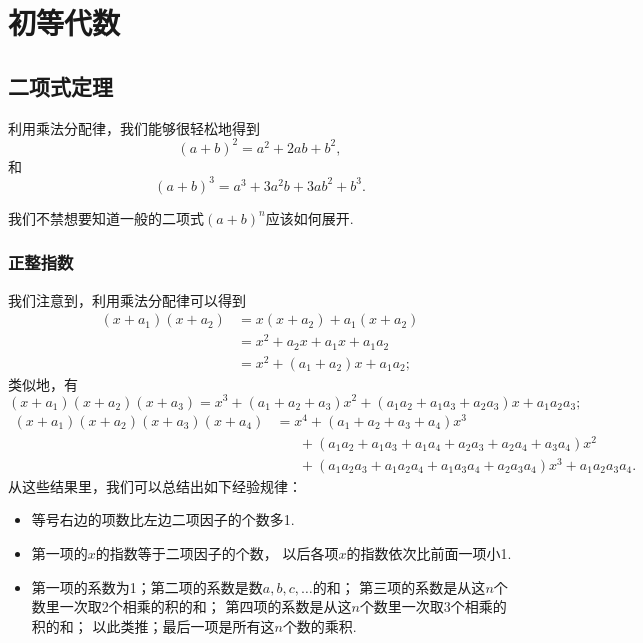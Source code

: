 \chapter{初等代数}
\section{二项式定理}
利用乘法分配律，我们能够很轻松地得到%
\begin{equation}
	(a + b)^2 = a^2 + 2ab + b^2,
\end{equation}
和%
\begin{equation}
	(a + b)^3 = a^3 + 3 a^2 b + 3 a b^2 + b^3.
\end{equation}

我们不禁想要知道一般的二项式\((a+b)^n\)应该如何展开.

\subsection{正整指数}
我们注意到，利用乘法分配律可以得到\begin{align*}
	(x+a_1)(x+a_2)
	&= x(x+a_2) + a_1(x+a_2) \\
	&= x^2 + a_2x + a_1x + a_1a_2 \\
	&= x^2 + (a_1+a_2)x + a_1a_2;
\end{align*}
类似地，有\begin{equation*}
	(x+a_1)(x+a_2)(x+a_3)
	= x^3 + (a_1+a_2+a_3)x^2 + (a_1a_2+a_1a_3+a_2a_3)x + a_1a_2a_3;
\end{equation*}\begin{align*}
	(x+a_1)(x+a_2)(x+a_3)(x+a_4)
	&= x^4 + (a_1+a_2+a_3+a_4)x^3 \\
		&\hspace{20pt}+ (a_1a_2+a_1a_3+a_1a_4+a_2a_3+a_2a_4+a_3a_4)x^2 \\
		&\hspace{20pt}+ (a_1a_2a_3+a_1a_2a_4+a_1a_3a_4+a_2a_3a_4)x^3 + a_1a_2a_3a_4.
\end{align*}
从这些结果里，我们可以总结出如下经验规律：
\begin{itemize}
	\item 等号右边的项数比左边二项因子的个数多1.
	\item 第一项的\(x\)的指数等于二项因子的个数，
	以后各项\(x\)的指数依次比前面一项小1.
	\item 第一项的系数为1；第二项的系数是数\(a,b,c,\dotsc\)的和；
	第三项的系数是从这\(n\)个数里一次取2个相乘的积的和；
	第四项的系数是从这\(n\)个数里一次取3个相乘的积的和；
	以此类推；最后一项是所有这\(n\)个数的乘积.
\end{itemize}

